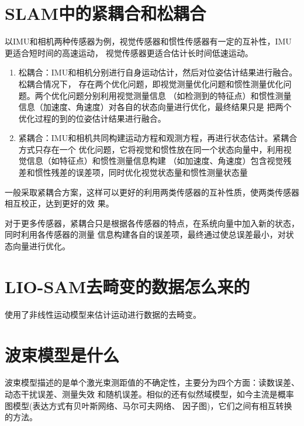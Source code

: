 \documentclass[10pt]{article}
\begin{document}
\section{SLAM中的紧耦合和松耦合}
以IMU和相机两种传感器为例，视觉传感器和惯性传感器有一定的互补性，IMU更适合短时间的高速运动，
视觉传感器更适合估计长时间低速运动。
\begin{enumerate}
    \item 松耦合：IMU和相机分别进行自身运动估计，然后对位姿估计结果进行融合。松耦合情况下，
    存在两个优化问题，即视觉测量优化问题和惯性测量优化问题。两个优化问题分别利用视觉测量信息
    （如检测到的特征点）和惯性测量信息（加速度、角速度）对各自的状态向量进行优化，最终结果只是
    把两个优化过程的到的位姿估计结果进行融合。
    \item 紧耦合：IMU和相机共同构建运动方程和观测方程，再进行状态估计。紧耦合方式只存在一个
    优化问题，它将视觉和惯性放在同一个状态向量中，利用视觉信息（如特征点）和惯性测量信息构建
    （如加速度、角速度）包含视觉残差和惯性残差的误差项，同时优化视觉状态量和惯性测量状态量
\end{enumerate}
一般采取紧耦合方案，这样可以更好的利用两类传感器的互补性质，使两类传感器相互校正，达到更好的效
果。

对于更多传感器，紧耦合只是根据各传感器的特点，在系统向量中加入新的状态，同时利用各传感器的测量
信息构建各自的误差项，最终通过使总误差最小，对状态向量进行优化。
\section{LIO-SAM去畸变的数据怎么来的}
使用了非线性运动模型来估计运动进行数据的去畸变。
\section{波束模型是什么}
波束模型描述的是单个激光束测距值的不确定性，主要分为四个方面：读数误差、动态干扰误差、测量失效
和随机误差。相似的还有似然域模型，如今主流是概率图模型(表达方式有贝叶斯网络、马尔可夫网络、
因子图)，它们之间有相互转换的方法。
\end{document}
